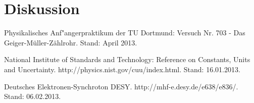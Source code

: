 \section{Diskussion}
	\label{diskussion}
	
\begin{thebibliography}{9}
	 Physikalisches Anf"angerpraktikum der TU Dortmund: Versuch Nr. 703 - Das Geiger-Müller-Zählrohr. Stand: April 2013.

	 National Institute of Standards and Technology: Reference on Constants, Units and Uncertainty. http://physics.nist.gov/cuu/index.html. Stand: 16.01.2013.

	 Deutsches Elektronen-Synchroton DESY. http://mhf-e.desy.de/e638/e836/. Stand: 06.02.2013.
\end{thebibliography}
